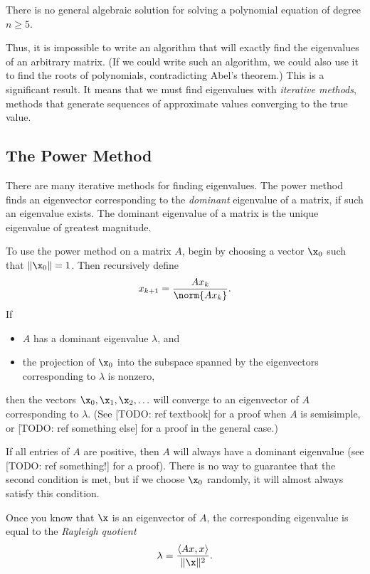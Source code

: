 \begin{theorem}
There is no general algebraic solution for solving a polynomial equation of degree $n\geq5$.
\label{thm:Abel}
\end{theorem}

Thus, it is impossible to write an algorithm that will exactly find the eigenvalues of an arbitrary matrix. 
(If we could write such an algorithm, we could also use it to find the roots of polynomials, contradicting Abel's theorem.) 
This is a significant result. 
It means that we must find eigenvalues with \emph{iterative methods}, methods that generate sequences of approximate values converging to the true value.

\subsection*{The Power Method}
There are many iterative methods for finding eigenvalues. 
The power method finds an eigenvector corresponding to the \emph{dominant} eigenvalue of a matrix, if such an eigenvalue exists.
The dominant eigenvalue of a matrix is the unique eigenvalue of greatest magnitude.

To use the power method on a matrix $A$, begin by choosing a vector $\x_0$ such that $\|\x_0\|=1$. Then recursively define
\[
x_{k+1}=\frac{Ax_k}{\norm{Ax_k}}.
\]
If 
\begin{itemize}
\item $A$ has a dominant eigenvalue $\lambda$, and
\item the projection of $\x_0$ into the subspace spanned by the eigenvectors corresponding to $\lambda$ is nonzero,
\end{itemize}
then the vectors $\x_0, \x_1, \x_2, \ldots$ will converge to an eigenvector of $A$ corresponding to $\lambda$. 
(See [TODO: ref textbook] for a proof when $A$ is semisimple, or [TODO: ref something else] for a proof in the general case.)

If all entries of $A$ are positive, then $A$ will always have a dominant eigenvalue (see [TODO: ref something!] for a proof). 
There is no way to guarantee that the second condition is met, but if we choose $\x_0$ randomly, it will almost always satisfy this condition.

Once you know that $\x$ is an eigenvector of $A$, the corresponding eigenvalue is equal to the \emph{Rayleigh quotient}
\[
\lambda = \frac{\langle Ax, x \rangle}{\|\x\|^2}.
\]



